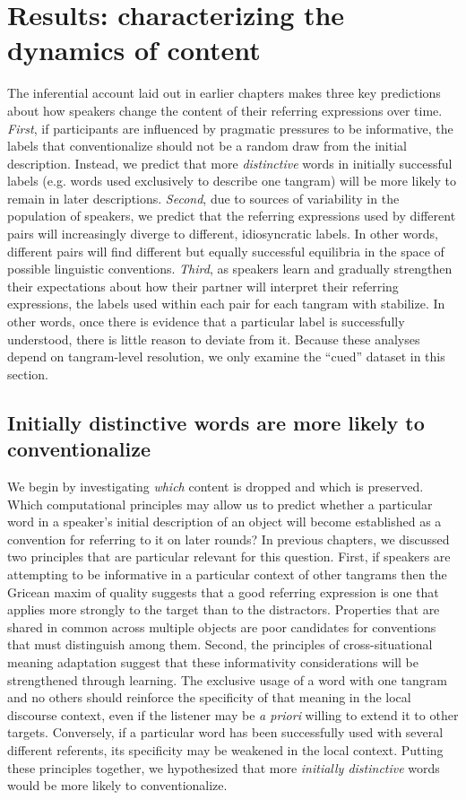 \section{Results: characterizing the dynamics of content}

The inferential account laid out in earlier chapters makes three key predictions about how speakers change the content of their referring expressions over time.
\emph{First}, if participants are influenced by pragmatic pressures to be informative, the labels that conventionalize should not be a random draw from the initial description. 
Instead, we predict that more \emph{distinctive} words in initially successful labels (e.g. words used exclusively to describe one tangram) will be more likely to remain in later descriptions.
\emph{Second}, due to sources of variability in the population of speakers, we predict that the referring expressions used by different pairs will increasingly diverge to different, idiosyncratic labels.
In other words, different pairs will find different but equally successful equilibria in the space of possible linguistic conventions.
\emph{Third}, as speakers learn and gradually strengthen their expectations about how their partner will interpret their referring expressions, the labels used within each pair for each tangram with stabilize.
In other words, once there is evidence that a particular label is successfully understood, there is little reason to deviate from it.
Because these analyses depend on tangram-level resolution, we only examine the ``cued'' dataset in this section.

\subsection{Initially distinctive words are more likely to conventionalize}
\label{sec:distinctive}

We begin by investigating \emph{which} content is dropped and which is preserved.
Which computational principles may allow us to predict whether a particular word in a speaker's initial description of an object will become established as a convention for referring to it on later rounds?
In previous chapters, we discussed two principles that are particular relevant for this question.
First, if speakers are attempting to be informative in a particular context of other tangrams then the Gricean maxim of quality suggests that a good referring expression is one that applies more strongly to the target than to the distractors. 
Properties that are shared in common across multiple objects are poor candidates for conventions that must distinguish among them.
Second, the principles of cross-situational meaning adaptation suggest that these informativity considerations will be strengthened through learning.
The exclusive usage of a word with one tangram and no others should reinforce the specificity of that meaning in the local discourse context, even if the listener may be \emph{a priori} willing to extend it to other targets.
Conversely, if a particular word has been successfully used with several different referents, its specificity may be weakened in the local context.
Putting these principles together, we hypothesized that more \emph{initially distinctive} words would be more likely to conventionalize.

